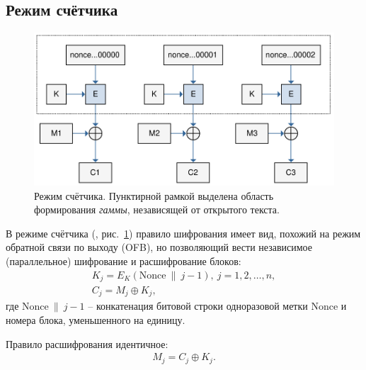 \subsection{Режим счётчика}

\begin{figure}[bt]
	\centering
	\includegraphics[width=1\textwidth]{pic/CTR}
	\caption{Режим счётчика. Пунктирной рамкой выделена область формирования \emph{гаммы}, независящей от открытого текста.}
	\label{fig:CTR}
\end{figure}

В режиме счётчика (, рис.~\ref{fig:CTR}) правило шифрования имеет вид, похожий на режим обратной связи по выходу (OFB), но позволяющий вести независимое (параллельное) шифрование и расшифрование блоков:
\[ \begin{array}{l}
    K_j = E_K(\textrm{Nonce} ~\|~ j - 1), ~ j = 1, 2, \dots, n, \\
    C_j = M_j \oplus K_j,
\end{array} \]
где $\textrm{Nonce} ~\|~ j - 1$ -- конкатенация битовой строки одноразовой метки $\textrm{Nonce}$ и номера блока, уменьшенного на единицу.

Правило расшифрования идентичное:
\[ \begin{array}{l}
    M_j = C_j \oplus K_j. \\
\end{array} \]
